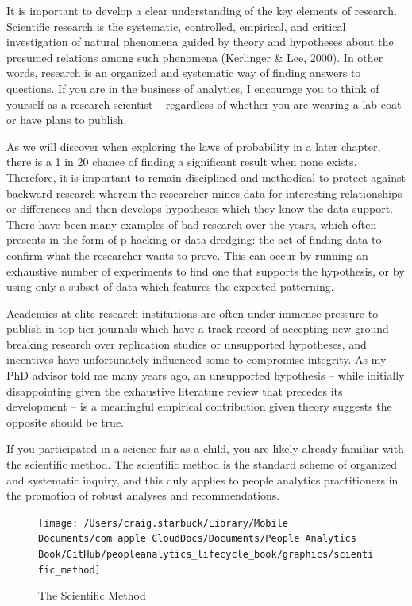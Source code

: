 \documentclass[]{book}
\begin{document}
It is important to develop a clear understanding of the key elements of research. Scientific research is the systematic, controlled, empirical, and critical investigation of natural phenomena guided by theory and hypotheses about the presumed relations among such phenomena (Kerlinger \& Lee, 2000). In other words, research is an organized and systematic way of finding answers to questions. If you are in the business of analytics, I encourage you to think of yourself as a research scientist -- regardless of whether you are wearing a lab coat or have plans to publish.

As we will discover when exploring the laws of probability in a later chapter, there is a 1 in 20 chance of finding a significant result when none exists. Therefore, it is important to remain disciplined and methodical to protect against backward research wherein the researcher mines data for interesting relationships or differences and then develops hypotheses which they know the data support. There have been many examples of bad research over the years, which often presents in the form of p-hacking or data dredging: the act of finding data to confirm what the researcher wants to prove. This can occur by running an exhaustive number of experiments to find one that supports the hypothesis, or by using only a subset of data which features the expected patterning.

Academics at elite research institutions are often under immense pressure to publish in top-tier journals which have a track record of accepting new ground-breaking research over replication studies or unsupported hypotheses, and incentives have unfortunately influenced some to compromise integrity. As my PhD advisor told me many years ago, an unsupported hypothesis -- while initially disappointing given the exhaustive literature review that precedes its development -- is a meaningful empirical contribution given theory suggests the opposite should be true.

If you participated in a science fair as a child, you are likely already familiar with the scientific method. The scientific method is the standard scheme of organized and systematic inquiry, and this duly applies to people analytics practitioners in the promotion of robust analyses and recommendations.

\begin{figure}

{\centering \texttt{[image: /Users/craig.starbuck/Library/Mobile Documents/com~apple~CloudDocs/Documents/People Analytics Book/GitHub/peopleanalytics\_lifecycle\_book/graphics/scientific\_method]} 

}

\caption{The Scientific Method}\label{fig:sci-method}
\end{figure}
\end{document}
